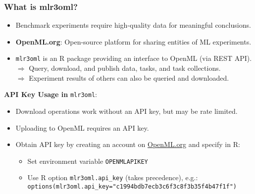 \documentclass[10pt,compress,t,notes=noshow, xcolor=table]{beamer}
\begin{document}
\begin{frame}[fragile]
\frametitle{What is mlr3oml?}


\begin{itemize}
  \item Benchmark experiments require high-quality data for meaningful conclusions.
  \item \textbf{OpenML.org}: Open-source platform for sharing entities of ML experiments.
  \item \texttt{mlr3oml} is an R package providing an interface to OpenML (via  REST API).\\
  $\Rightarrow$ Query, download, and publish data, tasks, and task collections.\\
  $\Rightarrow$ Experiment results of others can also be queried and downloaded.
\end{itemize}

\textbf{API Key Usage in} \texttt{mlr3oml}:
\begin{itemize}
  \item Download operations work without an API key, but may be rate limited.
  \item Uploading to OpenML requires an API key.
  \item Obtain API key by creating an account on \url{OpenML.org} and specify in R:
  \begin{itemize}
    \item Set environment variable \texttt{OPENMLAPIKEY}
    \item Use R option \texttt{mlr3oml.api\_key} (takes precedence), e.g.:\\
    \texttt{options(mlr3oml.api\_key="c1994bdb7ecb3c6f3c8f3b35f4b47f1f")}
  \end{itemize}
\end{itemize}

\end{frame}
\end{document}
